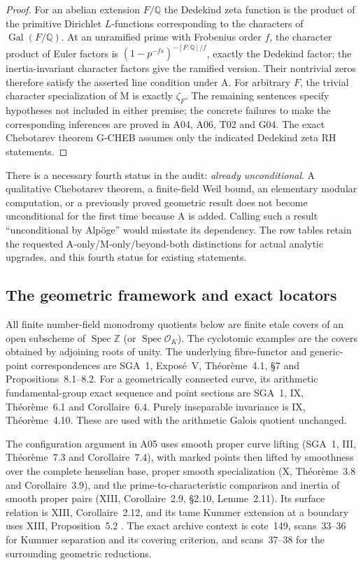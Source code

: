 \documentclass[11pt,a4paper]{article}
\begin{document}
\begin{proof}
For an abelian extension $F/\mathbb Q$ the Dedekind zeta function
is the product of the primitive Dirichlet $L$-functions corresponding to the
characters of $\operatorname{Gal}(F/\mathbb Q)$. At an unramified
prime with Frobenius order $f$, the character product of Euler
factors is $(1-p^{-fs})^{-[F:\mathbb Q]/f}$, exactly the Dedekind
factor; the inertia-invariant character factors give the ramified
version. Their nontrivial
zeros therefore satisfy the asserted line condition under A.
For arbitrary $F$, the trivial character specialization of M is
exactly $\zeta_F$. The remaining sentences specify hypotheses not
included in either premise; the concrete failures to make the
corresponding inferences are proved in A04, A06, T02 and G04.
The exact Chebotarev theorem G-CHEB assumes only the indicated
Dedekind zeta RH statements.
\end{proof}

There is a necessary fourth status in the audit: \emph{already
unconditional}. A qualitative Chebotarev theorem, a finite-field
Weil bound, an elementary modular computation, or a previously proved
geometric result does not become unconditional for the first time
because A is added. Calling such a result ``unconditional by Alp\"oge''
would misstate its dependency. The row tables retain the requested
A-only/M-only/beyond-both distinctions for actual analytic upgrades,
and this fourth status for existing statements.

\subsection{The geometric framework and exact locators}

All finite number-field monodromy quotients below are finite etale
covers of an open subscheme of $\operatorname{Spec}\mathbb Z$ (or
$\operatorname{Spec}\mathcal O_K$). The cyclotomic examples are the
covers obtained by adjoining roots of unity. The underlying
fibre-functor and generic-point correspondences are SGA~1,
Expos\'e~V, Th\'eor\`eme~4.1, \S7 and Propositions~8.1--8.2.
For a geometrically connected curve, its arithmetic fundamental-group
exact sequence and point sections are SGA~1, IX, Th\'eor\`eme~6.1
and Corollaire~6.4. Purely inseparable invariance is IX,
Th\'eor\`eme~4.10. These are used with the arithmetic Galois quotient
unchanged.

The configuration argument in A05 uses smooth proper curve lifting
(SGA~1, III, Th\'eor\`eme~7.3 and Corollaire~7.4), with marked
points then lifted by smoothness over the complete henselian base,
proper smooth
specialization (X, Th\'eor\`eme~3.8 and Corollaire~3.9), and the
prime-to-characteristic comparison and inertia of smooth proper pairs
(XIII, Corollaire~2.9, \S2.10, Lemme~2.11). Its surface relation is
XIII, Corollaire~2.12, and its tame Kummer extension at a boundary
uses XIII, Proposition~5.2 \cite{SGA1}. The exact archive context is
cote~149, scans~33--36 for Kummer separation and its covering
criterion, and scans~37--38 for the surrounding geometric reductions.
\end{document}
